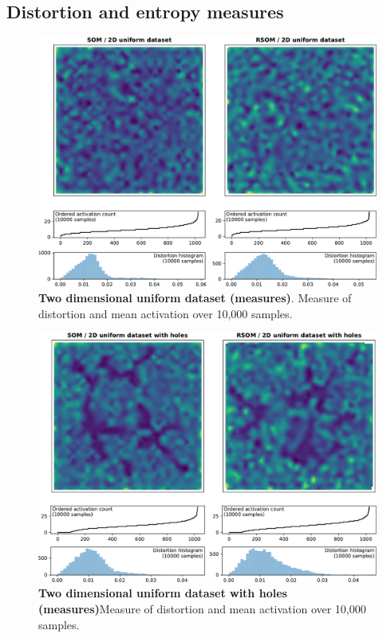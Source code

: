 \subsection{Distortion and entropy measures}

\begin{figure}
  \includegraphics[width=\columnwidth]{experiment-2D-uniform-activation-distortion.pdf}
  \caption{\textbf{Two dimensional uniform dataset (measures)}. Measure of distortion and mean activation over 10,000 samples.}%
\end{figure}

\begin{figure}
  \includegraphics[width=\columnwidth]{experiment-2D-holes-activation-distortion.pdf}
  \caption{\textbf{Two dimensional uniform dataset with holes (measures)}Measure of distortion and mean activation over 10,000 samples.}%
\end{figure}

